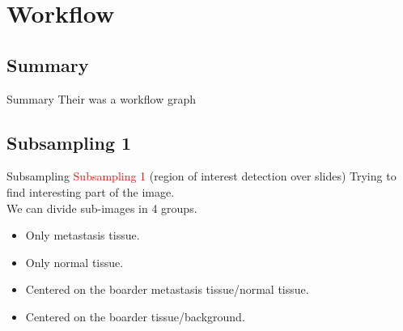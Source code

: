 \documentclass{beamer}
\begin{document}
\section{Workflow}

\subsection{Summary}
\begin{frame}{Summary}
Their was a workflow graph
\end{frame}

\subsection{Subsampling 1}
\begin{frame}{Subsampling}
\textcolor{red}{Subsampling 1} (region of interest detection over slides)
Trying to find interesting part of the image. \\
We can divide sub-images in 4 groups.
\begin{itemize}
\item Only metastasis tissue.
\item Only normal tissue.
\item Centered on the boarder metastasis tissue/normal tissue.
\item Centered on the boarder tissue/background.
\end{itemize}
\end{frame}
\end{document}
